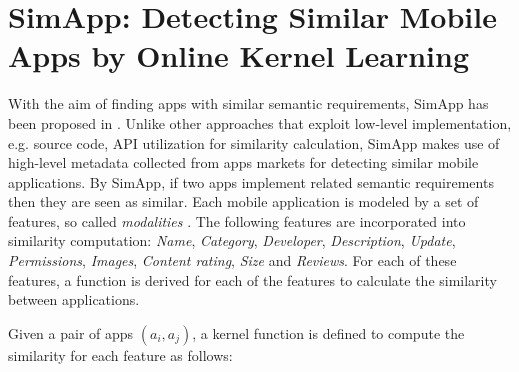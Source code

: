 \vspace{-.2cm}

\section{SimApp: Detecting Similar Mobile Apps by Online Kernel Learning} \label{sec:SimApp}

With the aim of finding apps with similar semantic requirements, SimApp has been proposed in \cite{Chen:2015:SFD:2684822.2685305}. Unlike other approaches that exploit low-level implementation, e.g. source code, API utilization for similarity calculation, SimApp makes use of high-level metadata collected from apps markets for detecting similar mobile applications. By SimApp, if two apps implement related semantic requirements then they are seen as similar. Each mobile application is modeled by a set of features, so called \emph{modalities}	. The following features are incorporated into similarity computation: \emph{Name}, \emph{Category}, \emph{Developer}, \emph{Description}, \emph{Update}, \emph{Permissions}, \emph{Images}, \emph{Content rating}, \emph{Size} and \emph{Reviews}. For each of these features, a function is derived for each of the features to calculate the similarity between applications.

Given a pair of apps $(a_{i},a_{j})$, a kernel function is defined to compute the similarity for each feature as follows: 

